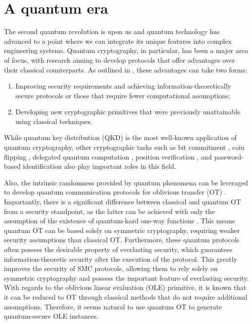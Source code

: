 \section*{A quantum era}

The second quantum revolution is upon us and quantum technology has advanced to a point where we can integrate its unique features into complex engineering systems. Quantum cryptography, in particular, has been a major area of focus, with research aiming to develop protocols that offer advantages over their classical counterparts. As outlined in \cite{B15, PSAN13}, these advantages can take two forms:

\begin{enumerate}
\item Improving security requirements and achieving information-theoretically secure protocols or those that require fewer computational assumptions;
\item Developing new cryptographic primitives that were previously unattainable using classical techniques.
\end{enumerate}
While quantum key distribution (QKD) is the most well-known application of quantum cryptography, other cryptographic tasks such as bit commitment \cite{CK11}, coin flipping \cite{CK09}, delegated quantum computation \cite{BFK09}, position verification \cite{Unr14}, and password-based identification \cite{DFSS14, DFLSS09} also play important roles in this field.

Also, the intrinsic randomness provided by quantum phenomena can be leveraged to develop quantum communication protocols for oblivious transfer (OT) \cite{BBCS92}. Importantly, there is a significant difference between classical and quantum OT from a security standpoint, as the latter can be achieved with only the assumption of the existence of quantum-hard one-way functions \cite{GLSV21, BCKM21}. This means quantum OT can be based solely on symmetric cryptography, requiring weaker security assumptions than classical OT. Furthermore, these quantum protocols often possess the desirable property of everlasting security, which guarantees information-theoretic security after the execution of the protocol. This greatly improves the security of SMC protocols, allowing them to rely solely on symmetric cryptography and possess the important feature of everlasting security. With regards to the oblivious linear evaluation (OLE) primitive, it is known that it can be reduced to OT \cite{KOS16} through classical methods that do not require additional assumptions. Therefore, it seems natural to use quantum OT to generate quantum-secure OLE instances.


